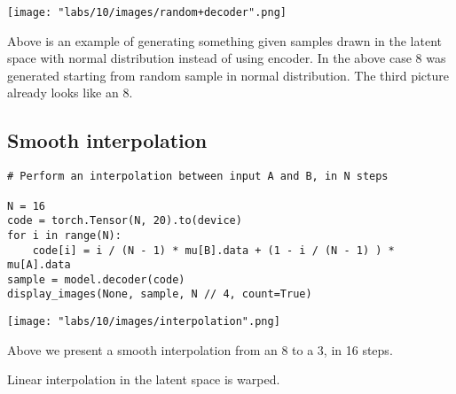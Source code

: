 \texttt{[image: "labs/10/images/random+decoder".png]}


Above is an example of generating something given samples drawn in the latent space with normal distribution instead of using encoder. In the above case 8 was generated starting from random sample in normal distribution. The third picture already looks like an 8.

\subsection{Smooth interpolation} 
\begin{verbatim}
# Perform an interpolation between input A and B, in N steps

N = 16
code = torch.Tensor(N, 20).to(device)
for i in range(N):
    code[i] = i / (N - 1) * mu[B].data + (1 - i / (N - 1) ) * mu[A].data
sample = model.decoder(code)
display_images(None, sample, N // 4, count=True)
\end{verbatim}

\texttt{[image: "labs/10/images/interpolation".png]}

Above we present a smooth interpolation from an 8 to a 3, in 16 steps.

Linear interpolation in the latent space is warped. 